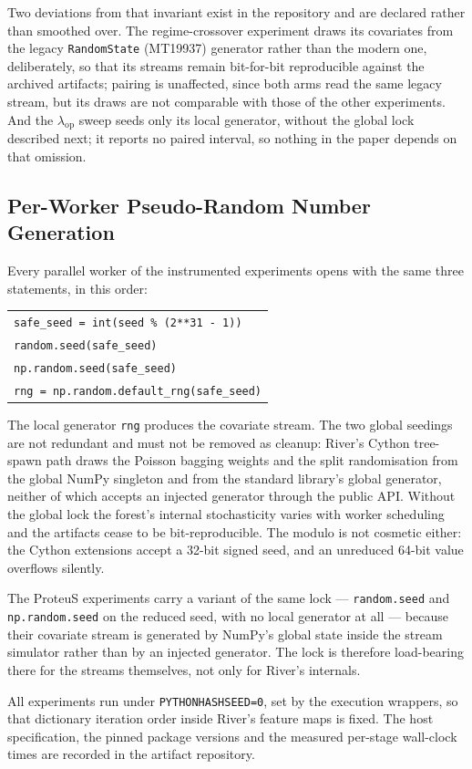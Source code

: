 Two deviations from that invariant exist in the repository and are declared rather than smoothed
over. The regime-crossover experiment draws its covariates from the legacy
\texttt{RandomState} (MT19937) generator rather than the modern one, deliberately, so that its streams remain bit-for-bit reproducible against the archived artifacts; pairing is unaffected, since both arms read the same
legacy stream, but its draws are not comparable with those of the other experiments. And the
$\lambda_{\mathrm{op}}$ sweep seeds only its local generator, without the global lock described
next; it reports no paired interval, so nothing in the paper depends on that omission.

\subsection{Per-Worker Pseudo-Random Number Generation}\label{sec:protocol_prng}

Every parallel worker of the instrumented experiments opens with the same three statements, in this
order:

\begin{center}
  \begin{tabular}{@{}l@{}}
    \texttt{safe\_seed = int(seed \% (2**31 - 1))} \\
    \texttt{random.seed(safe\_seed)} \\
    \texttt{np.random.seed(safe\_seed)} \\
    \texttt{rng = np.random.default\_rng(safe\_seed)} \\
  \end{tabular}
\end{center}

The local generator \texttt{rng} produces the covariate stream. The two global seedings are not
redundant and must not be removed as cleanup: River's Cython tree-spawn path draws the Poisson
bagging weights and the split randomisation from the global NumPy singleton and from the standard
library's global generator, neither of which accepts an injected generator through the public API.
Without the global lock the forest's internal stochasticity varies with worker scheduling and the
artifacts cease to be bit-reproducible. The modulo is not cosmetic either: the Cython extensions
accept a 32-bit signed seed, and an unreduced 64-bit value overflows silently.

The ProteuS experiments carry a variant of the same lock --- \texttt{random.seed} and
\texttt{np.random.seed} on the reduced seed, with no local generator at all --- because their
covariate stream is generated by NumPy's global state inside the stream simulator rather than by an
injected generator. The lock is therefore load-bearing there for the streams themselves, not only
for River's internals.

All experiments run under \texttt{PYTHONHASHSEED=0}, set by the execution wrappers, so that
dictionary iteration order inside River's feature maps is fixed. The host specification, the pinned
package versions and the measured per-stage wall-clock times are recorded in the artifact
repository.
